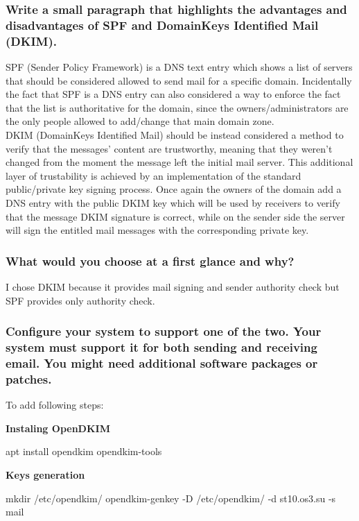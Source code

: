 \documentclass[a4paper,11pt]{article}
\begin{document}
\subsubsection{Write a small paragraph that highlights the advantages and disadvantages of SPF and DomainKeys Identified Mail (DKIM).}
SPF (Sender Policy Framework) is a DNS text entry which shows a list of servers that should be considered allowed to send mail for a specific domain. Incidentally the fact that SPF is a DNS entry can also considered a way to enforce the fact that the list is authoritative for the domain, since the owners/administrators are the only people allowed to add/change that main domain zone.\\
DKIM (DomainKeys Identified Mail) should be instead considered a method to verify that the messages' content are trustworthy, meaning that they weren't changed from the moment the message left the initial mail server. This additional layer of trustability is achieved by an implementation of the standard public/private key signing process. Once again the owners of the domain add a DNS entry with the public DKIM key which will be used by receivers to verify that the message DKIM signature is correct, while on the sender side the server will sign the entitled mail messages with the corresponding private key.

\subsubsection{What would you choose at a first glance and why?}
I chose DKIM because it provides mail signing and sender authority check but SPF provides only authority check.

\subsubsection{Configure your system to support one of the two. Your system must support it for both sending and receiving email. You might need additional software packages or patches.}

To add following steps:

\textbf{Instaling OpenDKIM}
\begin{bashcode}
apt install opendkim opendkim-tools
\end{bashcode}

\textbf{Keys generation}
\begin{bashcode}
mkdir /etc/opendkim/
opendkim-genkey -D /etc/opendkim/ -d st10.os3.su -s mail
\end{bashcode}
\end{document}
